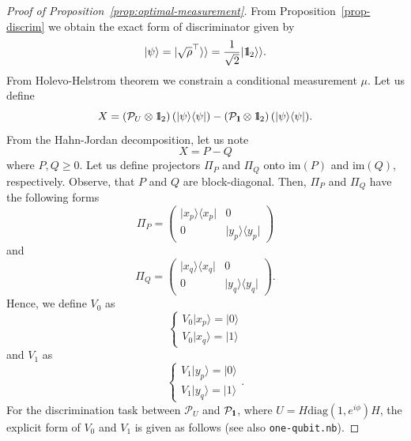 \documentclass[preprint,12pt, a4paper]{elsarticle}
\newcommand{\ket}[1]{\ensuremath{|#1\rangle}}
\newcommand{\bra}[1]{\ensuremath{\langle#1|}}
\newcommand{\ketbra}[2]{\ensuremath{\ket{#1}\bra{#2}}}
\newcommand{\proj}[1]{\ensuremath{\ketbra{#1}{#1}}}
\newcommand{\1}{{\rm 1\hspace{-0.9mm}l}}
\newcommand{\Id}{{\rm 1\hspace{-0.9mm}l}}
\newcommand{\PP}{\mathcal{P}}
\newcommand{\diag}{\mathrm{diag}}
\begin{document}
\begin{proof}[Proof of Proposition~\ref{prop:optimal-measurement}]
	From Proposition~\ref{prop-discrim} we obtain the exact form of discriminator given by
	\begin{equation}
	\ket{\psi} = | \sqrt{\rho}^\top \rangle \rangle = \frac{1}{\sqrt{2}} |\Id_2 
	\rangle \rangle. 
	\end{equation}
	From Holevo-Helstrom theorem  we constrain a conditional measurement $\mu$.  
	Let us define 
	\begin{equation}
	X  = \left( \PP_U \otimes \Id_2 \right)(\proj{\psi}) -  \left( \PP_\Id 
	\otimes \Id_2 \right)(\proj{\psi}).
	\end{equation} 
	From the Hahn-Jordan decomposition, let us note
	\begin{equation}
	X = P - Q
	\end{equation}
	where $P, Q \ge 0 $. 
	Let us define projectors $\Pi_P$ and $\Pi_Q$ onto  $\text{im}(P)$ and $\text{im}(Q)$, 
	respectively. Observe, that $P $ and $Q$ are block-diagonal.  Then,  $\Pi_P$ and $\Pi_Q$ have the following forms
	\begin{equation}
	\Pi_P = \left(\begin{array}{cc}\proj{x_p}&0\\0&\proj{y_p}\end{array}\right) 
	\end{equation}
	and 
	\begin{equation}
	\Pi_Q = \left(\begin{array}{cc}\proj{x_q}&0\\0&\proj{y_q}\end{array}\right). 
	\end{equation}
	Hence, we define $V_0$ as
	\begin{equation}
	\begin{cases} V_0 \ket{x_p} = \ket{0} \\ V_0 \ket{x_q} = \ket{1} \end{cases}
	\end{equation}
	and $V_1$ as
	\begin{equation}
	\begin{cases} 
	V_1 \ket{y_p} = \ket{0} \\ 
	V_1 \ket{y_q} = \ket{1}
	\end{cases}. 
	\end{equation}
	For the discrimination task between $\PP_{U}$ and $\PP_{\Id}$, where $U = H 
	\diag(1, e^{i \phi })H$, the explicit form of $V_0$ and $V_1$ is given as 
	follows (see also \texttt{one-qubit.nb}).

\end{proof}
\end{document}
